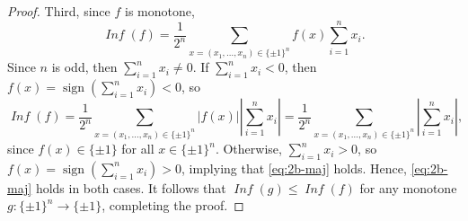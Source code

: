 \documentclass[letterpaper, reqno,11pt]{article}
\DeclareMathOperator{\sign}{sign}
\DeclareMathOperator{\Inf}{\mathit{Inf}}
\begin{document}
\begin{enumerate}
\begin{enumerate}
\begin{proof}
      Third, since $f$ is monotone,
      $$ \Inf(f) = \frac{1}{2^n} \sum_{x = \left(x_1, \ldots, x_n\right) \in \{ \pm 1 \}^n} f(x) \sum_{i = 1}^n x_i. $$
      Since $n$ is odd, then $\sum_{i = 1}^n x_i \neq 0$. If $\sum_{i = 1}^n x_i < 0$, then $f(x) = \sign(\sum_{i = 1}^n x_i) < 0$, so
      \begin{equation} \label{eq:2b-maj}
        \Inf(f) = \frac{1}{2^n} \sum_{x = \left(x_1, \ldots, x_n\right) \in \{ \pm 1 \}^n} |f(x)| \left|\sum_{i = 1}^n x_i\right| = \frac{1}{2^n} \sum_{x = \left(x_1, \ldots, x_n\right) \in \{ \pm 1 \}^n} \left|\sum_{i = 1}^n x_i\right|,
      \end{equation}
      since $f(x) \in \{ \pm 1 \}$ for all $x \in \{ \pm 1 \}^n$. Otherwise, $\sum_{i = 1}^n x_i > 0$, so $f(x) = \sign(\sum_{i = 1}^n x_i) > 0$, implying that \eqref{eq:2b-maj} holds. Hence, \eqref{eq:2b-maj} holds in both cases. It follows that $\Inf(g) \leq \Inf(f)$ for any monotone $g : \{ \pm 1 \}^n \to \{ \pm 1 \}$, completing the proof.
    \end{proof}
  \end{enumerate}
\end{enumerate}
\end{document}

